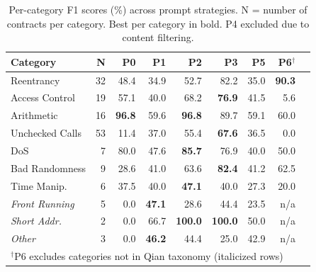 \begin{table}[t]
\caption{Per-category F1 scores (\%) across prompt strategies. N = number of contracts per category. Best per category in bold. P4 excluded due to content filtering.}
\label{tab:rq2_category}
\centering
\scriptsize
\begin{tabular}{lrrrrrrrr}
\toprule
\textbf{Category} & \textbf{N} & \textbf{P0} & \textbf{P1} & \textbf{P2} & \textbf{P3} & \textbf{P5} & \textbf{P6}$^\dagger$ \\
\midrule
Reentrancy & 32 & 48.4 & 34.9 & 52.7 & 82.2 & 35.0 & \textbf{90.3} \\
Access Control & 19 & 57.1 & 40.0 & 68.2 & \textbf{76.9} & 41.5 & 5.6 \\
Arithmetic & 16 & \textbf{96.8} & 59.6 & \textbf{96.8} & 89.7 & 59.1 & 60.0 \\
Unchecked Calls & 53 & 11.4 & 37.0 & 55.4 & \textbf{67.6} & 36.5 & 0.0 \\
DoS & 7 & 80.0 & 47.6 & \textbf{85.7} & 76.9 & 40.0 & 50.0 \\
Bad Randomness & 9 & 28.6 & 41.0 & 63.6 & \textbf{82.4} & 41.2 & 62.5 \\
Time Manip. & 6 & 37.5 & 40.0 & \textbf{47.1} & 40.0 & 27.3 & 20.0 \\
\midrule
\textit{Front Running} & 5 & 0.0 & \textbf{47.1} & 28.6 & 44.4 & 23.5 & n/a \\
\textit{Short Addr.} & 2 & 0.0 & 66.7 & \textbf{100.0} & \textbf{100.0} & 50.0 & n/a \\
\textit{Other} & 3 & 0.0 & \textbf{46.2} & 44.4 & 25.0 & 42.9 & n/a \\
\bottomrule
\multicolumn{9}{l}{\scriptsize $^\dagger$P6 excludes categories not in Qian taxonomy (italicized rows)} \\
\end{tabular}
\end{table}
